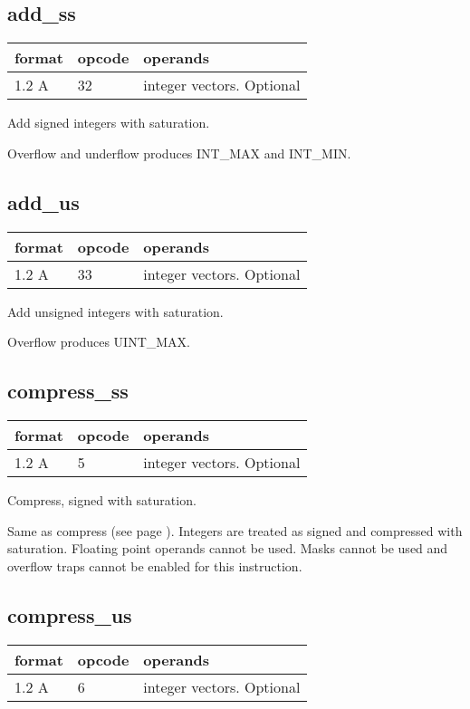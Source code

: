 \documentclass[forwardcom.tex]{subfiles}
\begin{document}
\subsection{add\_ss}
\label{table:addSsInstruction}
\begin{tabular}{|p{12mm}|p{15mm}|p{100mm}|}
\hline
\bfseries format & \bfseries opcode & \bfseries operands \\ \hline
1.2 A & 32 & integer vectors. Optional \\ \hline
\end{tabular}
\vv

Add signed integers with saturation.

Overflow and underflow produces INT\_MAX and INT\_MIN.
\vv

\subsection{add\_us}
\label{table:addUsInstruction}
\begin{tabular}{|p{12mm}|p{15mm}|p{100mm}|}
\hline
\bfseries format & \bfseries opcode & \bfseries operands \\ \hline
1.2 A & 33 & integer vectors. Optional \\ \hline
\end{tabular}
\vv

Add unsigned integers with saturation.

Overflow produces UINT\_MAX.
\vv

\subsection{compress\_ss}
\label{table:compressSsInstruction}
\begin{tabular}{|p{12mm}|p{15mm}|p{100mm}|}
\hline
\bfseries format & \bfseries opcode & \bfseries operands \\ \hline
1.2 A & 5 & integer vectors. Optional \\ \hline
\end{tabular}
\vv

Compress, signed with saturation.
\vv

Same as compress (see page \pageref{table:compressInstruction}). Integers are treated as signed and compressed with saturation. Floating point operands cannot be used. 
Masks cannot be used and overflow traps cannot be enabled for this instruction.
\vv

\subsection{compress\_us}
\label{table:compressUsInstruction}
\begin{tabular}{|p{12mm}|p{15mm}|p{100mm}|}
\hline
\bfseries format & \bfseries opcode & \bfseries operands \\ \hline
1.2 A & 6 & integer vectors. Optional \\ \hline
\end{tabular}
\vv
\end{document}
